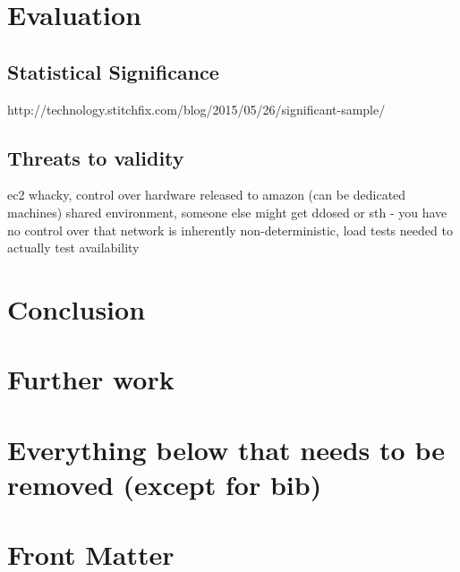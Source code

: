 \documentclass{uvamscse}
\begin{document}
\chapter{Evaluation}

\section{Statistical Significance}
http://technology.stitchfix.com/blog/2015/05/26/significant-sample/

\section{Threats to validity}
ec2 whacky, control over hardware released to amazon (can be dedicated machines)
shared environment, someone else might get ddosed or sth - you have no control over that
network is inherently non-deterministic, load tests needed to actually test availability


\chapter{Conclusion}

\chapter{Further work}

\chapter{Everything below that needs to be removed (except for bib)}
\chapter{Front Matter}
\end{document}
